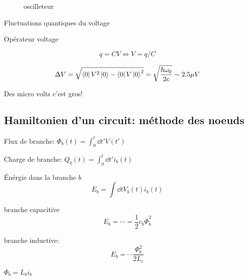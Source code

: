 \begin{figure}[ht]
		\centering
		\caption{oscilleteur}
		\label{fig:oscilleteur}
\end{figure}


Fluctuations quantiques du voltage

Opérateur voltage


\[ q = CV \iff V = q/C \]

\[ \Delta V = \sqrt{\bra{0}V^{2}\ket{0} - \bra{0}V \ket{0}^2} = \sqrt{\hbar \omega_0 \over 2 c} \sim 2.5\mu V\]


Des micro volts c'est gros!



\subsection{Hamiltonien d'un circuit: méthode des noeuds}

Flux de branche: $\Phi_b (t) = \int_{0}^{t}\dd t' V (t') $

Charge de branche: $Q_b (t) = \int_{0}^{t}\dd t' i_b (t)$


Énérgie dans la branche $b$ \[ 	E_b = \int \dd t V_b (t)  i_b (t)\]


branche capacitive \[ E_b = \dotsb = \frac{1}{2} c_b \dot \Phi_b^{2} \]

branche inductive: \[ E_b = \dotsb \frac{\Phi_b^2}{2L_c}  \]

$\Phi_b = L_b i_b $




